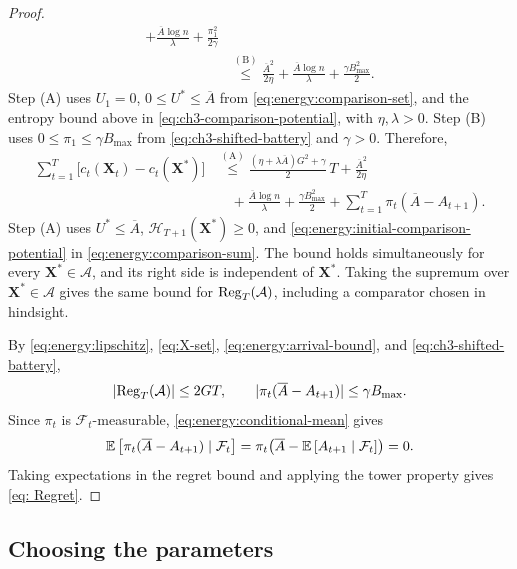 \begin{proof}
\begin{equation}
\begin{aligned}
   +\frac{\overline A\log n}{\lambda}+\frac{\pi_1^2}{2\gamma}\\
 &\overset{\mathrm{(B)}}{\leq}\frac{\overline A^2}{2\eta}
   +\frac{\overline A\log n}{\lambda}+\frac{\gamma B_{\mathrm{max}}^2}{2}.
\end{aligned}
\end{equation}
Step (A) uses $U_1=0$, $0\leq U^*\leq\overline A$ from
\eqref{eq:energy:comparison-set}, and the entropy bound above in
\eqref{eq:ch3-comparison-potential}, with $\eta,\lambda>0$. Step (B) uses
$0\leq\pi_1\leq\gamma B_{\mathrm{max}}$ from
\eqref{eq:ch3-shifted-battery} and $\gamma>0$.
Therefore,
\begin{equation}
\label{main after expet}
\begin{aligned}
 \sum_{t=1}^T\bigl[c_t(\mathbf X_t)-c_t(\mathbf X^*)\bigr]
 &\overset{\mathrm{(A)}}{\leq}
   \frac{(\eta+\lambda\overline A)G^2+\gamma}{2}\,T
   +\frac{\overline A^2}{2\eta}\\
 &\quad+\frac{\overline A\log n}{\lambda}
   +\frac{\gamma B_{\mathrm{max}}^2}{2}
   +\sum_{t=1}^T\pi_t(\overline A-A_{t+1}).
\end{aligned}
\end{equation}
Step (A) uses $U^*\leq\overline A$, $\mathcal H_{T+1}(\mathbf X^*)\geq0$,
and \eqref{eq:energy:initial-comparison-potential} in
\eqref{eq:energy:comparison-sum}.
The bound holds simultaneously for every $\mathbf X^*\in\mathcal A$,
and its right side is independent of $\mathbf X^*$.
Taking the supremum over $\mathbf X^*\in\mathcal A$ gives the same bound for
$\mathrm{Reg}_T(\mathcal A)$, including a comparator chosen in hindsight.

By \eqref{eq:energy:lipschitz}, \eqref{eq:X-set},
\eqref{eq:energy:arrival-bound}, and \eqref{eq:ch3-shifted-battery},
\[
 |\mathrm{Reg}_T(\mathcal A)|\leq2GT,\qquad
 |\pi_t(\overline A-A_{t+1})|\leq\gamma B_{\mathrm{max}}.
\]
Since $\pi_t$ is $\mathcal F_t$-measurable,
\eqref{eq:energy:conditional-mean} gives
\begin{equation}\label{quu1 bound}
 \mathbb{E}\left[\pi_t(\overline A-A_{t+1})\mid\mathcal F_t\right]
 =\pi_t\bigl(\overline A-\mathbb{E}\left[A_{t+1}\mid\mathcal F_t\right]\bigr)=0.
\end{equation}
Taking expectations in the regret bound and applying the tower property
gives \eqref{eq: Regret}.
\end{proof}

\subsection{Choosing the parameters}

